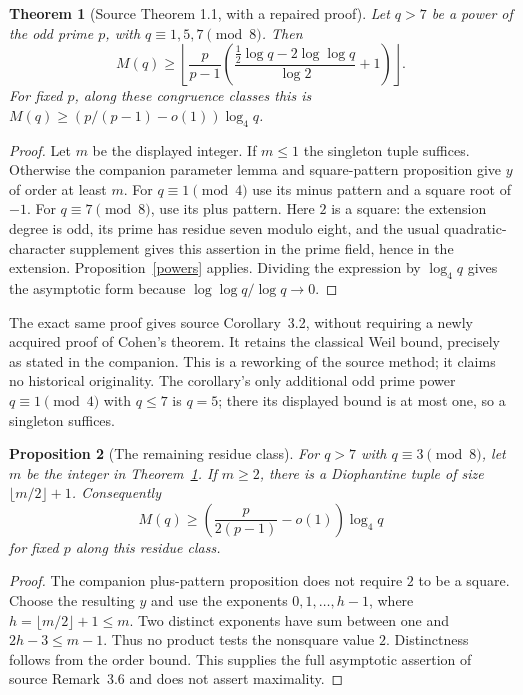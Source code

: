 \documentclass[11pt,a4paper]{article}
\newtheorem{theorem}{Theorem}
\newtheorem{proposition}[theorem]{Proposition}
\begin{document}
\begin{theorem}[Source Theorem 1.1, with a repaired proof]\label{main}
Let $q>7$ be a power of the odd prime $p$, with $q\equiv1,5,7\pmod8$.
Then
\[
 M(q)\ge \left\lfloor\frac p{p-1}
 \left(\frac{\frac12\log q-2\log\log q}{\log2}+1\right)\right\rfloor.
\]
For fixed $p$, along these congruence classes this is
$M(q)\ge(p/(p-1)-o(1))\log_4q$.
\end{theorem}
\begin{proof}
Let $m$ be the displayed integer. If $m\le1$ the singleton tuple suffices.
Otherwise the companion parameter lemma and square-pattern proposition
give $y$ of order at least $m$. For $q\equiv1\pmod4$ use its minus
pattern and a square root of $-1$. For $q\equiv7\pmod8$, use its plus
pattern. Here $2$ is a square: the extension degree is odd, its prime
has residue seven modulo eight, and the usual quadratic-character
supplement gives this assertion in the prime field, hence in the extension.
Proposition~\ref{powers} applies. Dividing the expression by $\log_4q$
gives the asymptotic form because $\log\log q/\log q\to0$.
\end{proof}

The exact same proof gives source Corollary~3.2, without requiring a
newly acquired proof of Cohen's theorem. It retains the classical Weil
bound, precisely as stated in the companion. This is a reworking of the
source method; it claims no historical originality. The corollary's only
additional odd prime power $q\equiv1\pmod4$ with $q\le7$ is $q=5$;
there its displayed bound is at most one, so a singleton suffices.

\begin{proposition}[The remaining residue class]
For $q>7$ with $q\equiv3\pmod8$, let $m$ be the integer in
Theorem~\ref{main}. If $m\ge2$, there is a Diophantine tuple of size
$\lfloor m/2\rfloor+1$. Consequently
\[
 M(q)\ge\left(\frac{p}{2(p-1)}-o(1)\right)\log_4q
\]
for fixed $p$ along this residue class.
\end{proposition}
\begin{proof}
The companion plus-pattern proposition does not require $2$ to be a
square. Choose the resulting $y$ and use the exponents
$0,1,\ldots,h-1$, where $h=\lfloor m/2\rfloor+1\le m$.
Two distinct exponents have sum between one and $2h-3\le m-1$.
Thus no product tests the nonsquare value $2$. Distinctness follows from
the order bound. This supplies the full asymptotic assertion of
source Remark~3.6 and does not assert maximality.
\end{proof}
\end{document}
